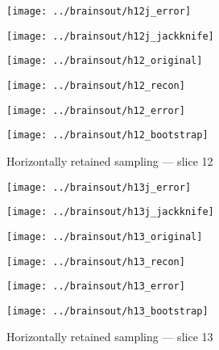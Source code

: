 \documentclass[review,supplement,onefignum,onetabnum,juq]{siamonline181217}
\begin{document}
\begin{figure}
\begin{centering}

\parbox{\imsize}{\texttt{[image: ../brainsout/h12j\_error]}}
\parbox{\imsize}{\texttt{[image: ../brainsout/h12j\_jackknife]}}

\vspace{\vertsep}

\parbox{\imsize}{\texttt{[image: ../brainsout/h12\_original]}}
\parbox{\imsize}{\texttt{[image: ../brainsout/h12\_recon]}}

\vspace{\vertsep}

\parbox{\imsize}{\texttt{[image: ../brainsout/h12\_error]}}
\parbox{\imsize}{\texttt{[image: ../brainsout/h12\_bootstrap]}}

\end{centering}
\caption{Horizontally retained sampling --- slice 12}
\end{figure}


\begin{figure}
\begin{centering}

\parbox{\imsize}{\texttt{[image: ../brainsout/h13j\_error]}}
\parbox{\imsize}{\texttt{[image: ../brainsout/h13j\_jackknife]}}

\vspace{\vertsep}

\parbox{\imsize}{\texttt{[image: ../brainsout/h13\_original]}}
\parbox{\imsize}{\texttt{[image: ../brainsout/h13\_recon]}}

\vspace{\vertsep}

\parbox{\imsize}{\texttt{[image: ../brainsout/h13\_error]}}
\parbox{\imsize}{\texttt{[image: ../brainsout/h13\_bootstrap]}}

\end{centering}
\caption{Horizontally retained sampling --- slice 13}
\end{figure}
\end{document}
